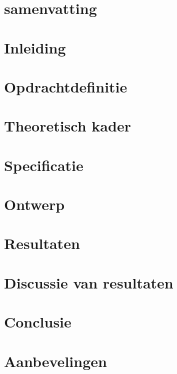 \documentclass[12pt, a4paper, twoside]{article}
\numberwithin{equation}{section}
\begin{document}
    \makeTitlepage
    \onecolumn

    \section{samenvatting}
    

    \tableofcontents
    \newpage

    \section{Inleiding}
    

    \section{Opdrachtdefinitie} \label{opdracht}
    

    \newpage
    \section{Theoretisch kader}
    

    \newpage
    \section{Specificatie}
    

    \newpage
    \section{Ontwerp}
    

    \newpage
    \section{Resultaten}
    

    \newpage
    \section{Discussie van resultaten}
    

    \newpage
    \section{Conclusie}
    

    \newpage
    \section{Aanbevelingen}
    

    \newpage
    \printbibliography

    \newpage
    \appendix
    
\end{document}
